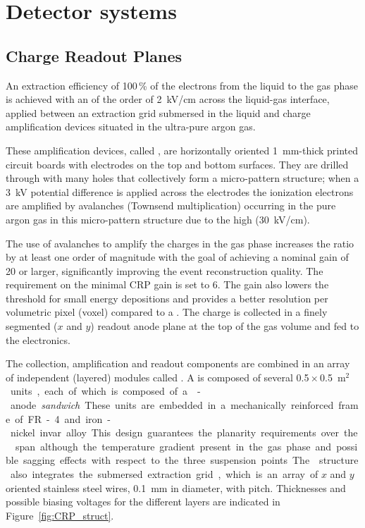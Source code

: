 \section{Detector systems}
\label{sec:dp-execsum-systems}

\subsection{Charge Readout Planes}
\label{sec:dp-execsum-crp}

An extraction efficiency of \num{100}\,\% of the electrons from the liquid to the gas phase is achieved with an \efield of the order of \SI{2}{kV/cm} across the liquid-gas interface, applied between an  extraction grid submersed in the liquid and charge amplification  devices situated in the ultra-pure argon gas. 

These amplification devices, called , are horizontally  oriented \SI{1}{mm}-thick printed  circuit boards with electrodes on the top and bottom surfaces. They are drilled through with many holes that collectively form a micro-pattern structure;  when a \SI{3}{kV} potential difference is applied across the electrodes the ionization electrons are amplified by avalanches (Townsend multiplication) occurring in the  pure argon gas in this micro-pattern structure due to the high \efield (\SI{30}{kV/cm}).

The use of avalanches to amplify the charges in the gas phase increases the  ratio by at least one order of magnitude with the goal of achieving a nominal gain of 20 or larger, significantly improving the event reconstruction quality. The requirement on the minimal CRP gain is set to 6.  The gain also lowers the threshold for small energy depositions and provides a better resolution per volumetric pixel (voxel) compared to a \single \lartpc.  The charge is collected in a finely segmented \twod ($x$ and $y$) readout anode plane at the top of the gas volume and fed to the  electronics.   

The  collection, amplification and readout components are combined in an array of independent (layered) modules called . A  is  composed of several \num{0.5}\,$\times$\,\SI{0.5}{m$^2$} units, each of which is composed  of a -anode \textit{sandwich}.  These units are embedded in a mechanically reinforced frame of FR-4 and iron-nickel invar alloy. This design guarantees the planarity requirements over the  span although the temperature gradient present in the gas phase and possible sagging effects with respect to the three suspension points. The  structure also integrates  the submersed extraction grid, which is an array of $x$ and $y$ oriented stainless steel wires, \SI{0.1}{mm} in diameter, with \dpstrippitch pitch. Thicknesses and possible biasing voltages for the different layers are indicated in Figure~\ref{fig:CRP_struct}.

